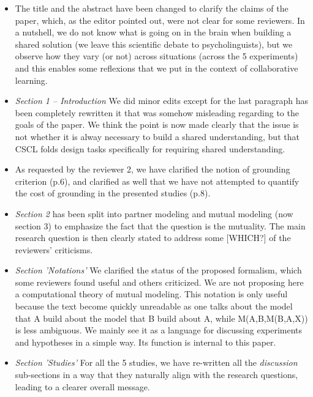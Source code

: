 \documentclass{article}
\begin{document}
\begin{itemize}

    \item The title and the abstract have been changed to clarify the
        claims of the paper, which, as the editor pointed out, were not clear
        for some reviewers. In a nutshell, we do not know what is going on in the
        brain when building a shared solution (we leave this scientific debate
        to psycholinguists), but we observe how they vary (or not) across
        situations (across the 5 experiments) and this enables some reflexions
        that we put in the context of collaborative learning.

    \item \emph{Section 1 -- Introduction} We did minor edits except for the last
        paragraph has been completely rewritten it  that was somehow misleading
        regarding to the goals of the paper.  We think the point is now made
        clearly that the issue is not whether it is alway necessary to build a
        shared understanding, but that CSCL folds design tasks specifically for
        requiring shared understanding.

    \item As requested by the reviewer 2, we have clarified the notion of
        grounding criterion (p.6), and clarified as well that we have not attempted to
        quantify the cost of grounding in the presented studies (p.8).

    \item \emph{Section 2} has been split into partner modeling and mutual modeling (now
        section 3) to emphasize the fact that the question is the mutuality. The
        main research question is then clearly stated to address some [WHICH?] of the
        reviewers' criticisms.

    \item \emph{Section 'Notations'} We clarified the status of the proposed formalism, which some
        reviewers found useful and others criticized. We are not
        proposing here a computational theory of mutual modeling. This notation is
        only useful because the text become quickly unreadable as one talks about
        the model that A build about the model that B build about A, while
        M(A,B,M(B,A,X)) is less ambiguous. We mainly see it as a language for discussing
        experiments and hypotheses in a simple way. Its function is internal to
        this paper.

    \item \emph{Section 'Studies'} For all the 5 studies, we have re-written all
        the \emph{discussion} sub-sections in a
        way that they naturally align with the research questions, leading to a
        clearer overall message.


\end{itemize}
\end{document}

